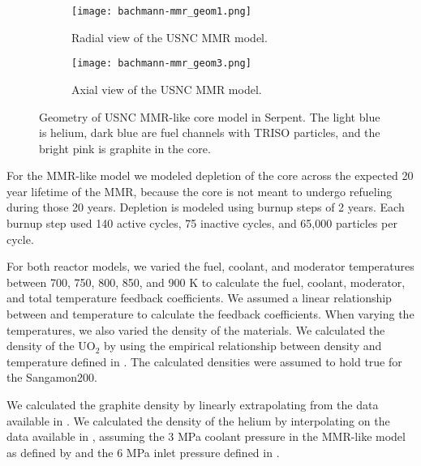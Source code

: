 \begin{figure}
        \begin{subfigure}{0.48\textwidth}
                \centering
                \texttt{[image: bachmann-mmr\_geom1.png]}
                \caption{Radial view of the USNC MMR model.}
                \label{fig:mmr_radial}
        \end{subfigure}
        \hfill 
        \begin{subfigure}{0.48\textwidth}
                \centering
                \texttt{[image: bachmann-mmr\_geom3.png]}
                \caption{Axial view of the USNC MMR model.}
                \label{fig:mmr_axial}
        \end{subfigure}
        \caption{Geometry of USNC MMR-like core model in Serpent. The 
        light blue is helium, dark blue are fuel channels with TRISO particles, 
        and the bright pink is graphite in the core.}
        \label{fig:mmr_core}
\end{figure}

For the \gls{MMR}-like model we modeled depletion of the core across the 
expected 20 year lifetime of the \gls{MMR}, because the core is not 
meant to undergo refueling during those 20 years. Depletion is modeled using 
burnup steps of 2 years. Each burnup step used 140 active cycles, 75 inactive 
cycles, and 65,000 particles per cycle. 

For both reactor models, we varied the fuel, coolant, and moderator temperatures 
between 700, 750, 800, 850, and 900 K to calculate the fuel, coolant, 
moderator, and total temperature feedback coefficients. We assumed a linear 
relationship between 
\keff and temperature to calculate the feedback coefficients. When varying the 
temperatures, we also varied the density of the materials. We calculated the 
density of the UO$_2$ by using the empirical relationship between density and 
temperature defined in \cite{fink_thermophysical_2000}. The calculated 
densities were assumed to hold true for the Sangamon200. 

We calculated the 
graphite density by linearly extrapolating from the data available in 
\cite{mceligot_thermal_nodate}. We calculated the density of the helium 
by interpolating on the data available in \cite{petersen_properties_nodate}, 
assuming the 3 MPa coolant pressure in the \gls{MMR}-like model as defined 
by \cite{noauthor_usnc_2021} and the 6 MPa inlet pressure defined in 
\cite{mulder_overview_2021}. 


